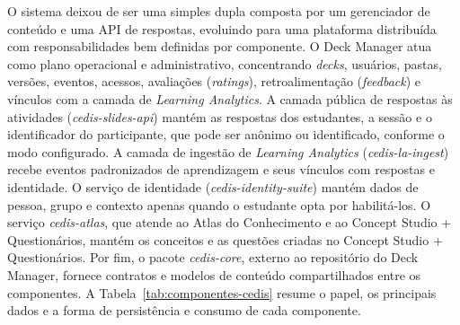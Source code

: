 O sistema deixou de ser uma simples dupla composta por um gerenciador de
conteúdo e uma API de respostas, evoluindo para uma plataforma distribuída
com responsabilidades bem definidas por componente. O Deck Manager atua
como plano operacional e administrativo, concentrando \textit{decks}, usuários,
pastas, versões, eventos, acessos, avaliações (\textit{ratings}),
retroalimentação (\textit{feedback}) e vínculos com a camada de
\textit{Learning Analytics}. A camada pública de respostas às atividades
(\textit{cedis-slides-api}) mantém as respostas dos estudantes, a sessão e o
identificador do participante, que pode ser anônimo ou identificado, conforme
o modo configurado. A camada de ingestão de \textit{Learning Analytics}
(\textit{cedis-la-ingest}) recebe eventos padronizados de aprendizagem e
seus vínculos com respostas e identidade. O serviço de identidade
(\textit{cedis-identity-suite}) mantém dados de pessoa, grupo e contexto
apenas quando o estudante opta por habilitá-los. O serviço \textit{cedis-atlas}, que atende
ao Atlas do Conhecimento e ao Concept Studio + Questionários, mantém os
conceitos e as questões criadas no Concept Studio + Questionários. Por
fim, o pacote \textit{cedis-core}, externo ao repositório do Deck Manager,
fornece contratos e modelos de conteúdo compartilhados entre os
componentes. A Tabela~\ref{tab:componentes-cedis} resume o papel, os
principais dados e a forma de persistência e consumo de cada componente.

